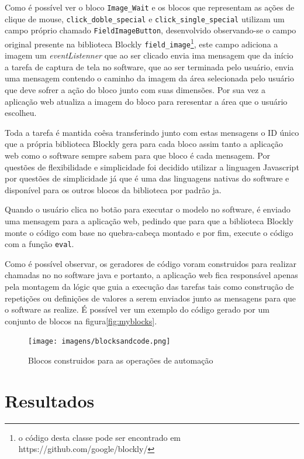 \documentclass[tg]{mdtufsm}
\begin{document}
    Como é possível ver o bloco \texttt{Image\_Wait} e os blocos que representam as ações de clique de mouse, \texttt{click\_doble\_special} e \texttt{click\_single\_special} utilizam um campo próprio chamado \texttt{FieldImageButton}, desenvolvido observando-se o campo original presente na biblioteca Blockly \texttt{field\_image}\footnote{o código desta classe pode ser encontrado em https://github.com/google/blockly/}, este campo adiciona a imagem um \emph{eventListenner} que ao ser clicado envia ima mensagem que da início a tarefa de captura de tela no software, que ao ser terminada pelo usuário, envia uma mensagem contendo o caminho da imagem da área selecionada pelo usuário que deve sofrer a ação do bloco junto com suas dimensões. Por sua vez a aplicação web atualiza a imagem do bloco para reresentar a área que o usuário escolheu.

    Toda a tarefa é mantida coêsa transferindo junto com estas mensagens o ID único que a própria biblioteca Blockly gera para cada bloco assim tanto a aplicação web como o software sempre sabem para que bloco é cada mensagem. Por questões de flexibilidade e simplicidade foi decidido utilizar a linguagen Javascript por questões de simplicidade já que é uma das linguagens nativas do software e disponível para os outros blocos da biblioteca por padrão ja.

    Quando o usuário clica no botão para executar o modelo no software, é enviado uma mensagem para a aplicação web, pedindo que para que a biblioteca Blockly monte o código com base no quebra-cabeça montado e por fim, execute o código com a função \texttt{eval}.

    Como é possível observar, os geradores de código voram construidos para realizar chamadas no no software java e portanto, a aplicação web fica responsável apenas pela montagem da lógic que guia a execução das tarefas tais como construção de repetições ou definições de valores a serem enviados junto as mensagens para que o software as realize. É possível ver um exemplo do código gerado por um conjunto de blocos na figura\ref{fig:myblocks}.

    \begin{figure}[!htb]
        {\centering
        \texttt{[image: imagens/blocksandcode.png]}
        \caption{Blocos construidos para as operações de automação}
        \label{fig:blocksAndCode}}
    \end{figure}

    \chapter {Resultados}
\end{document}
